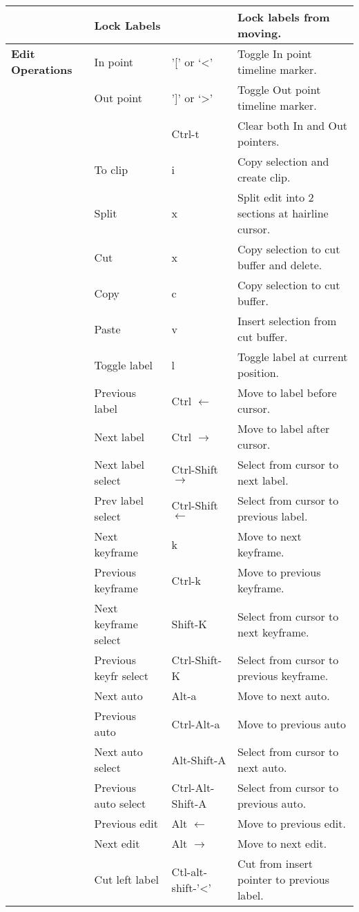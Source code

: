 \begin{longtable}[h]{>{\bfseries}p{}p{}p{}p{}}
  & Lock Labels &  & Lock labels from moving. \\
  \midrule
  \textcolor{CinBlueText}{Edit Operations} & In point & '[' or ‘<’ & Toggle In point timeline marker. \\
  & Out point & ']' or ‘>’ & Toggle Out point timeline marker. \\
  &  & Ctrl-t & Clear both In and Out pointers. \\
  & To clip & i & Copy selection and create clip. \\
  & Split & x & Split edit into 2 sections at hairline cursor. \\
  & Cut & x & Copy selection to cut buffer and delete. \\
  & Copy & c & Copy selection to cut buffer. \\
  & Paste & v & Insert selection from cut buffer. \\
  & Toggle label & l & Toggle label at current position. \\
  & Previous label & Ctrl $\leftarrow$ & Move to label before cursor. \\
  & Next label & Ctrl $\rightarrow$ & Move to label after cursor. \\
  & Next label select & Ctrl-Shift $\rightarrow$ & Select from cursor to next label. \\
  & Prev label select & Ctrl-Shift $\leftarrow$ & Select from cursor to previous label. \\
  & Next keyframe & k & Move to next keyframe. \\
  & Previous keyframe & Ctrl-k & Move to previous keyframe. \\
  & Next keyframe select & Shift-K & Select from cursor to next keyframe. \\
  & Previous keyfr select & Ctrl-Shift-K & Select from cursor to previous keyframe. \\
  & Next auto& Alt-a & Move to next auto. \\
  & Previous auto & Ctrl-Alt-a & Move to previous auto\\
  & Next auto select & Alt-Shift-A & Select from cursor to next auto. \\
  & Previous auto select & Ctrl-Alt-Shift-A & Select from cursor to previous auto. \\
  & Previous edit & Alt $\leftarrow$ & Move to previous edit. \\
  & Next edit & Alt $\rightarrow$ & Move to next edit. \\
  & Cut left label & Ctl-alt-shift-'<' & Cut from insert pointer to previous label. \\

\end{longtable}
